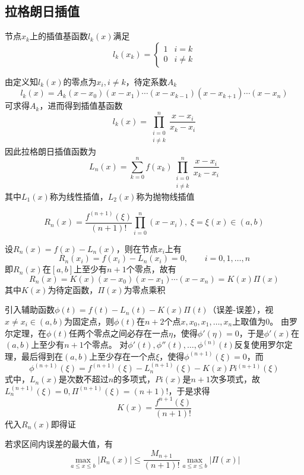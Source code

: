 \subsection{拉格朗日插值}
\begin{definition}[拉格朗日插值基函数]
节点$x_k$上的插值基函数$l_k(x)$满足
\[l_k(x_k)=\begin{cases}1&i=k\\0&i\ne k\end{cases}\]
\end{definition}
\par 由定义知$l_k(x)$的零点为$x_i,i\ne k$，待定系数$A_k$
\[l_k(x)=A_k(x-x_0)(x-x_1)\cdots(x-x_{k-1})(x-x_{k+1})\cdots(x-x_n)\]
可求得$A_k$，进而得到插值基函数
\[l_k(x)=\prod_{\substack{i=0\\i\ne k}}^{n}\frac{x-x_i}{x_k-x_i}\]
因此拉格朗日插值函数为
\[L_n(x)=\sum_{k=0}^nf(x_k)\prod_{\substack{i=0\\i\ne k}}^{n}\frac{x-x_i}{x_k-x_i}\]
其中$L_1(x)$称为线性插值，$L_2(x)$称为抛物线插值

\begin{theorem}[Lagrange函数的误差估计]
\[R_n(x)=\frac{f^{(n+1)}(\xi)}{(n+1)!}\prod_{i=0}^n(x-x_i),\;\xi=\xi(x)\in(a,b)\]
\end{theorem}
\begin{analysis}
    设$R_n(x)=f(x)-L_n(x)$，则在节点$x_i$上有
    \[R_n(x_i)=f(x_i)-L_n(x_i)=0,\qquad i=0,1,\ldots,n\]
    即$R_n(x)$在$[a,b]$上至少有$n+1$个零点，故有
    \[R_n(x)=K(x)(x-x_0)(x-x_1)\cdots(x-x_n)=K(x)\Pi(x)\]
    其中$K(x)$为待定函数，$\Pi(x)$为零点乘积

    引入辅助函数$\phi(t)=f(t)-L_n(t)-K(x)\Pi(t)$（误差-误差），视$x\ne x_i\in(a,b)$为固定点，则$\phi(t)$在$n+2$个点$x,x_0,x_1,\ldots,x_n$上取值为$0$。
    由罗尔定理，在$\phi(t)$任两个零点之间必存在一点$\eta$，使得$\phi'(\eta)=0$，于是$\phi'(x)$在$(a,b)$上至少有$n+1$个零点。
    对$\phi'(t),\phi''(t),\ldots,\phi^{(n)}(t)$反复使用罗尔定理，最后得到在$(a,b)$上至少存在一个点$\xi$，使得$\phi^{(n+1)}(\xi)=0$，而
    \[\phi^{(n+1)}(\xi)=f^{(n+1)}(\xi)-L_n^{(n+1)}(\xi)-K(x)Pi^{(n+1)}(\xi)\]
    式中，$L_n(x)$是次数不超过$n$的多项式，$Pi(x)$是$n+1$次多项式，故$L_n^{(n+1)}(\xi)=0,\Pi^{(n+1)}(\xi)=(n+1)!$，于是求得
    \[K(x)=\frac{f^{n+1}(\xi)}{(n+1)!}\]
    代入$R_n(x)$即得证
\end{analysis}

若求区间内误差的最大值，有
\[\max_{a\leq x\leq b}|R_n(x)|\leq\frac{M_{n+1}}{(n+1)!}\max_{a\leq x\leq b}|\Pi(x)|\]

